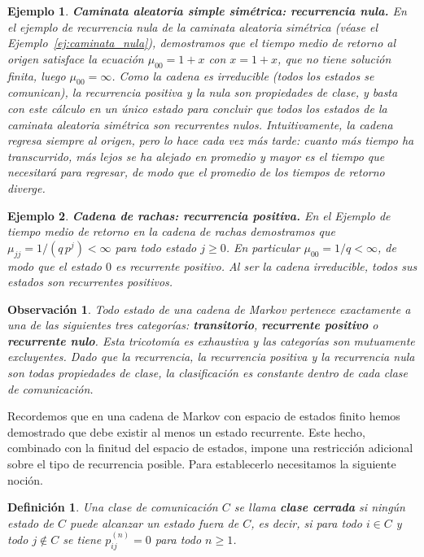 \documentclass[12pt]{book}
\newtheorem{definition}{Definición}[chapter]
\newtheorem{example}{Ejemplo}[chapter]
\newtheorem{remark}{Observación}[chapter]
\begin{document}
\begin{example}
    \textbf{Caminata aleatoria simple simétrica: recurrencia nula.}
    En el ejemplo de recurrencia nula de la caminata aleatoria simétrica (véase el Ejemplo~\ref{ej:caminata_nula}), demostramos que el tiempo medio de retorno al origen satisface la ecuación $\mu_{00} = 1 + x$ con $x = 1 + x$, que no tiene solución finita, luego $\mu_{00} = \infty$. Como la cadena es irreducible (todos los estados se comunican), la recurrencia positiva y la nula son propiedades de clase, y basta con este cálculo en un único estado para concluir que \emph{todos} los estados de la caminata aleatoria simétrica son recurrentes nulos. Intuitivamente, la cadena regresa siempre al origen, pero lo hace cada vez más tarde: cuanto más tiempo ha transcurrido, más lejos se ha alejado en promedio y mayor es el tiempo que necesitará para regresar, de modo que el promedio de los tiempos de retorno diverge.
\end{example}

\begin{example}
    \textbf{Cadena de rachas: recurrencia positiva.}
    En el Ejemplo de tiempo medio de retorno en la cadena de rachas demostramos que $\mu_{jj} = 1/(q\,p^j) < \infty$ para todo estado $j \ge 0$. En particular $\mu_{00} = 1/q < \infty$, de modo que el estado $0$ es recurrente positivo. Al ser la cadena irreducible, todos sus estados son recurrentes positivos.
\end{example}

\begin{remark}
    Todo estado de una cadena de Markov pertenece exactamente a una de las siguientes tres categorías: \textbf{transitorio}, \textbf{recurrente positivo} o \textbf{recurrente nulo}. Esta tricotomía es exhaustiva y las categorías son mutuamente excluyentes. Dado que la recurrencia, la recurrencia positiva y la recurrencia nula son todas propiedades de clase, la clasificación es constante dentro de cada clase de comunicación.
\end{remark}

Recordemos que en una cadena de Markov con espacio de estados finito hemos demostrado que debe existir al menos un estado recurrente. Este hecho, combinado con la finitud del espacio de estados, impone una restricción adicional sobre el tipo de recurrencia posible. Para establecerlo necesitamos la siguiente noción.

\begin{definition}
    Una clase de comunicación $C$ se llama \textbf{clase cerrada} si ningún estado de $C$ puede alcanzar un estado fuera de $C$, es decir, si para todo $i \in C$ y todo $j \notin C$ se tiene $p_{ij}^{(n)} = 0$ para todo $n \ge 1$.
\end{definition}
\end{document}
